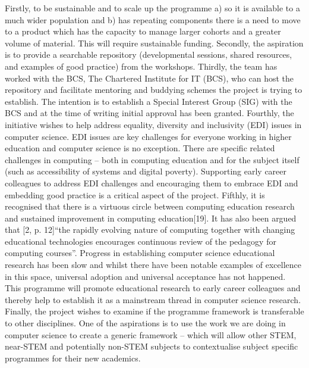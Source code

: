 \documentclass[sigconf]{acmart}
\begin{document}
Firstly, to be sustainable and to scale up the programme a) so it is available to a much wider population and b) has repeating components there is a need to move to a product which has the capacity to manage larger cohorts and a greater volume of material. This will require sustainable funding. Secondly, the aspiration is to provide a searchable repository (developmental sessions, shared resources, and examples of good practice) from the workshops. Thirdly, the team has worked with the BCS, The Chartered Institute for IT (BCS), who can host the repository and facilitate mentoring and buddying schemes the project is trying to establish. The intention is to establish a Special Interest Group (SIG) with the BCS \cite{BCSSIG} and at the time of writing initial approval has been granted. Fourthly, the initiative wishes to help address equality, diversity and inclusivity (EDI) issues in computer science. EDI issues are key challenges for everyone working in higher education and computer science is no exception. There are specific related challenges in computing – both in computing education and for the subject itself (such as accessibility of systems and digital poverty). Supporting early career colleagues to address EDI challenges and encouraging them to embrace EDI and embedding good practice is a critical aspect of the project. Fifthly, it is recognised that there is a virtuous circle between computing education research and sustained improvement in computing education[19]. It has also been argued that [2, p. 12]“the rapidly evolving nature of computing together with changing educational technologies encourages continuous review of the pedagogy for computing courses”. Progress in establishing computer science educational research has been slow and whilst there have been notable examples of excellence in this space, universal adoption and universal acceptance has not happened. This programme will promote educational research to early career colleagues and thereby help to establish it as a mainstream thread in computer science research. Finally, the project wishes to examine if the programme framework is transferable to other disciplines. One of the aspirations is to use the work we are doing in computer science to create a generic framework – which will allow other STEM, near-STEM and potentially non-STEM subjects to contextualise subject specific programmes for their new academics.
\end{document}
